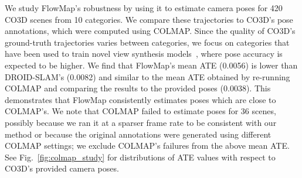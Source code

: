 We study FlowMap's robustness by using it to estimate camera poses for 420 CO3D scenes from 10 categories.
We compare these trajectories to CO3D's pose annotations, which were computed using COLMAP.
Since the quality of CO3D's ground-truth trajectories varies between categories, we focus on categories that have been used to train novel view synthesis models~\cite{tewari2023diffusion,chan2023generative,wewer24latentsplat}, where pose accuracy is expected to be higher.
We find that FlowMap's mean ATE (0.0056) is lower than DROID-SLAM's (0.0082) and similar to the mean ATE obtained by re-running COLMAP and comparing the results to the provided poses (0.0038).
This demonstrates that FlowMap consistently estimates poses which are close to COLMAP's.
We note that COLMAP failed to estimate poses for 36 scenes, possibly because we ran it at a sparser frame rate to be consistent with our method or because the original annotations were generated using different COLMAP settings; we exclude COLMAP's failures from the above mean ATE.
See Fig.~\ref{fig:colmap_study} for distributions of ATE values with respect to CO3D's provided camera poses.
\vspace{-10pt}
